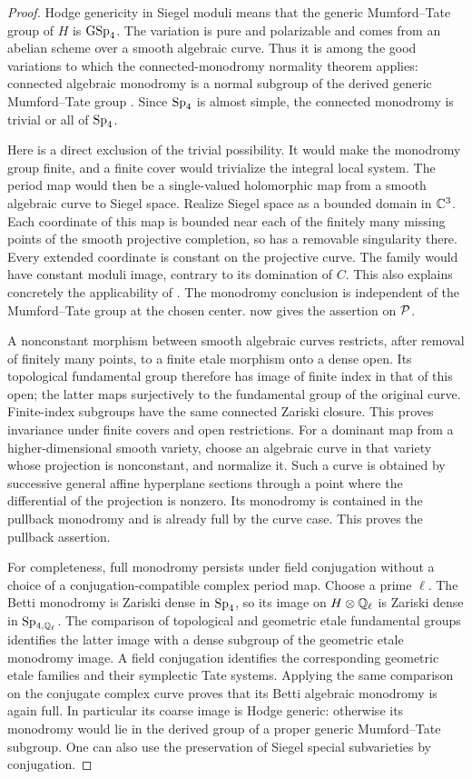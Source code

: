 \begin{proof}
Hodge genericity in Siegel moduli means that the generic
Mumford--Tate group of $H$ is $\operatorname{GSp}_4$.  The variation is pure and
polarizable and comes from an abelian scheme over a smooth
algebraic curve.  Thus it is among the good variations to which
the connected-monodromy normality theorem applies: connected
algebraic monodromy is a normal subgroup of the derived generic
Mumford--Tate group
\cite[\S5, Theorem~1]{Andre1992}.  Since $\operatorname{Sp}_4$ is almost simple,
the connected monodromy is trivial or all of $\operatorname{Sp}_4$.

Here is a direct exclusion of the trivial possibility.  It would
make the monodromy group finite, and a finite cover would trivialize
the integral local system.  The period map would then be a
single-valued holomorphic map from a smooth algebraic curve to
Siegel space.  Realize Siegel space as a bounded domain in
$\mathbb C^3$.  Each coordinate of this map is bounded near each of the
finitely many missing points of the smooth projective completion,
so has a removable singularity there.  Every extended coordinate
is constant on the projective curve.  The family would have
constant moduli image, contrary to its domination of $C$.
This also explains concretely the applicability of
\cite[\S6, Remark~1]{Andre1992}.  The monodromy conclusion is
independent of the Mumford--Tate group at the chosen center.
 now gives the assertion on $\mathcal P$.

A nonconstant morphism between smooth algebraic curves restricts,
after removal of finitely many points, to a finite etale morphism
onto a dense open.  Its topological fundamental group therefore
has image of finite index in that of this open; the latter maps
surjectively to the fundamental group of the original curve.
Finite-index subgroups have the same connected Zariski closure.
This proves invariance under finite covers and open restrictions.
For a dominant map from a higher-dimensional smooth variety,
choose an algebraic curve in that variety whose projection is
nonconstant, and normalize it.  Such a curve is obtained by
successive general affine hyperplane sections through a point
where the differential of the projection is nonzero.  Its
monodromy is contained in the pullback monodromy and is already
full by the curve case.  This proves the pullback assertion.

For completeness, full monodromy persists under field conjugation
without a choice of a conjugation-compatible complex period map.
Choose a prime $\ell$.  The Betti monodromy is Zariski dense in
$\operatorname{Sp}_4$, so its image on $H\otimes\mathbb Q_\ell$ is Zariski dense in
$\operatorname{Sp}_{4,\mathbb Q_\ell}$.  The comparison of topological and geometric
etale fundamental groups identifies the latter image with a dense
subgroup of the geometric etale monodromy image.  A field
conjugation identifies the corresponding geometric etale families
and their symplectic Tate systems.  Applying the same comparison
on the conjugate complex curve proves that its Betti algebraic
monodromy is again full.  In particular its coarse image is Hodge
generic: otherwise its monodromy would lie in the derived group
of a proper generic Mumford--Tate subgroup.  One can also use
the preservation of Siegel special subvarieties by conjugation.


\end{proof}
